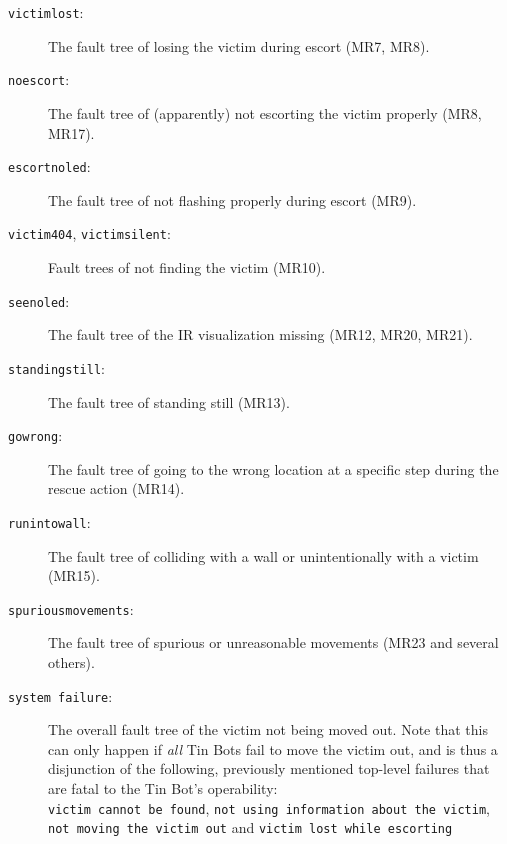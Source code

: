 \documentclass[a4paper,parskip,headheight=38pt]{scrartcl} %
\begin{document}
\begin{description}
\item[\texttt{victimlost}:]
    The fault tree of losing the victim during escort (MR7, MR8).
\item[\texttt{noescort}:]
    The fault tree of (apparently) not escorting the victim properly
    (MR8, MR17).
\item[\texttt{escortnoled}:]
    The fault tree of not flashing properly during escort (MR9).
\item[\texttt{victim404}, \texttt{victimsilent}:]
    Fault trees of not finding the victim (MR10).
\item[\texttt{seenoled}:]
    The fault tree of the IR visualization missing (MR12, MR20, MR21).
\item[\texttt{standingstill}:]
    The fault tree of standing still (MR13).
\item[\texttt{gowrong}:]
    The fault tree of going to the wrong location at a specific step
    during the rescue action (MR14).
\item[\texttt{runintowall}:]
    The fault tree of colliding with a wall or unintentionally with a
    victim (MR15).
\item[\texttt{spuriousmovements}:]
    The fault tree of spurious or unreasonable movements (MR23 and
    several others).
\item[\texttt{system failure}:] 
    The overall fault tree of the victim not being moved out.  Note
    that this can only happen if \emph{all} Tin Bots fail to move the
    victim out, and is thus a disjunction of the following, previously
    mentioned top-level failures that are fatal to the Tin Bot's
    operability:
     \\
    \texttt{victim cannot be found}, \texttt{not using information
    about the victim}, \texttt{not moving the victim out} and
    \texttt{victim lost while escorting}
\end{description}
\end{document}
